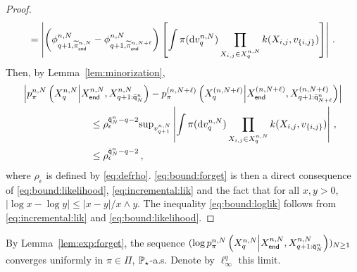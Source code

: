\begin{proof}
\begin{multline*}
= \left| \left(\phi^{n,N}_{q+1,\widetilde{\pi}^{n,N}_\mathsf{end}}-\phi^{n,N}_{q+1,\widetilde{\pi}^{n,N+\ell}_\mathsf{end}}\right)\left[\int\pi(\mathrm{d} v^{n,N}_q)\prod_{X_{i,j}\in X_{q}^{n,N}}k(X_{i,j},v_{\{i,j\}})\right]\right|\,.
\end{multline*}
Then, by Lemma~\ref{lem:minorization},
\begin{align*}
\left|p_{\pi}^{n,N}\left(X_{q}^{n,N}\middle|X_{\mathsf{end}}^{n,N},X_{q+1:\ordermax{n}{N}}^{n,N}\right) -  p_{\pi}^{(n,N+\ell)}\left(X_{q}^{(n,N+\ell)}\middle|X_{\mathsf{end}}^{(n,N+\ell)},X_{q+1:\ordermax{n}{N+\ell}}^{(n,N+\ell)}\right) \right|&\\
&\hspace{-9cm}\leq \rho_{\epsilon}^{\ordermax{n}{N}-q-2} \sup_{v^{n,N}_{q+1}}\left|\int\pi(\rmd v^{n,N}_q)\prod_{X_{i,j}\in X_{q}^{n,N}}\condlik(X_{i,j},v_{\{i,j\}})\right|\eqsp,\\
&\hspace{-9cm}\le\rho_{\epsilon}^{\ordermax{n}{N}-q-2} \eqsp,
\end{align*}
where $\rho_{\epsilon}$ is defined by \eqref{eq:defrho}. \eqref{eq:bound:forget} is then a direct consequence of \eqref{eq:bound:likelihood}, \eqref{eq:incremental:lik} and the fact that 
for all $x,y>0$, $|\log x - \log y| \le |x-y|/x\wedge y$.
The inequality \eqref{eq:bound:loglik} follows from \eqref{eq:incremental:lik} and \eqref{eq:bound:likelihood}. 
\end{proof}

By Lemma~\ref{lem:exp:forget}, the sequence $(\log p_{\pi}^{n,N}\left(X_{q}^{n,N}\middle|X_{\mathsf{end}}^{n,N},X_{q+1:\bar{\mathsf{q}}^{n}_{N}}^{n,N}\right))_{N\ge 1}$ converges uniformly in $\pi\in\Pi$, $\mathbb{P}_{\star}$-a.s. Denote by $\ell^q_{\infty}$ this limit. 



